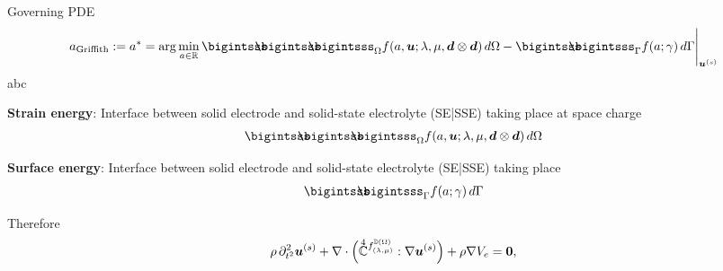 \documentclass[25pt, a0paper,
portrait,
margin=2mm, 
innermargin=2mm, 
blockverticalspace=7mm, %
colspace=2mm, %
subcolspace=0mm]{tikzposter}
\begin{document}
{\begin{minipage}{0.43\textwidth}
\begin{mdframed}
			Governing PDE
			\begin{align*}
				a_{\text{Griffith}} := a^{*} = \arg\min_{a\in\mathbb{R}}{\bigintsss\!\!\!\!\!\!\bigintsss\!\!\!\!\!\!\bigintsss_{\Omega} f(a,\bm{u};\lambda,\mu,\bm{d}\otimes\bm{d}) \, d\Omega - \bigintsss\!\!\!\!\!\!\bigintsss_{\Gamma} f(a;\gamma) \, d\Gamma}\Bigg|_{\bm{u}^{(s)}}
			\end{align*}
			abc
		\end{mdframed}
		\begin{minipage}{0.5\textwidth}
			\begin{mdframed}
				\textbf{Strain energy}: 
				Interface between solid electrode and solid-state electrolyte (SE|SSE) 
				taking place at space charge
				\begin{align*}
					\bigintsss\!\!\!\!\!\!\bigintsss\!\!\!\!\!\!\bigintsss_{\Omega}
					f(a,\bm{u};\lambda,\mu,\bm{d}\otimes\bm{d}) \, d\Omega 
				\end{align*}
			\end{mdframed}
		\end{minipage}
		\hfill 
		\begin{minipage}{0.49\textwidth}
			\begin{mdframed}
				\textbf{Surface energy}: 
				Interface between solid electrode and solid-state electrolyte (SE|SSE) 
				taking place 
				\begin{align*} 
					\bigintsss\!\!\!\!\!\!\bigintsss_{\Gamma} f(a;\gamma) \, d\Gamma
				\end{align*}
			\end{mdframed}
		\end{minipage}
		\begin{mdframed}
			Therefore
			\begin{align*}
				 & \rho\,
				\partial^2_{t^2}
				\bm{u}^{(s)}
				+
				\nabla \cdot
				\Big(
				\accentset{\scriptstyle 4}{\mathbb{C}}^{f^{\mathbb{D}(\Omega)}_{(\lambda,\mu)}}
				:\nabla\Bu^{(s)}
				\Big)
				+
				\rho\nabla V_{e}
				= \textbf{0},                                                                                                                                                                                                                                                               \\

\end{align*}
\end{mdframed}
\end{minipage}}
\end{document}
